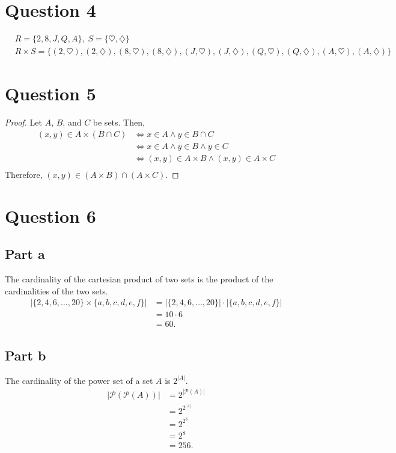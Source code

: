 \documentclass{article}
\begin{document}
\section*{Question 4}
\begin{align*}
    &R = \{2, 8, J, Q, A\}, \; S = \{\heartsuit, \diamondsuit\} \\
    &R \times S = \{(2, \heartsuit), (2, \diamondsuit), (8, \heartsuit), (8, \diamondsuit), (J, \heartsuit), (J, \diamondsuit), (Q, \heartsuit), (Q, \diamondsuit), (A, \heartsuit), (A, \diamondsuit)\}
\end{align*}

\section*{Question 5}
\begin{proof}
    Let $A$, $B$, and $C$ be sets.
    Then,
    \begin{align*}
        (x, y) \in A \times (B \cap C) &\Longleftrightarrow x \in A \land y \in B \cap C \\
        &\Longleftrightarrow x \in A \land y \in B \land y \in C \\
        &\Longleftrightarrow (x, y) \in A \times B \land (x, y) \in A \times C \\
    \end{align*}
    Therefore, $(x, y) \in (A \times B) \cap (A \times C)$.
\end{proof}

\section*{Question 6}

\subsection*{Part a}
The cardinality of the cartesian product of two sets is the product of the cardinalities of the two sets.
\begin{align*}
    |\{2, 4, 6, \dots, 20\} \times \{a, b, c, d, e, f\}| &= |\{2, 4, 6, \dots, 20\}| \cdot |\{a, b, c, d, e, f\}| \\
    &= 10 \cdot 6 \\
    &= 60.
\end{align*}

\subsection*{Part b}
The cardinality of the power set of a set $A$ is $2^{|A|}$.
\begin{align*}
    |\mathcal{P}(\mathcal{P}(A))| &= 2^{|\mathcal{P}(A)|} \\
    &= 2^{2^{|A|}} \\
    &= 2^{2^3} \\
    &= 2^8 \\
    &= 256.
\end{align*}
\end{document}
